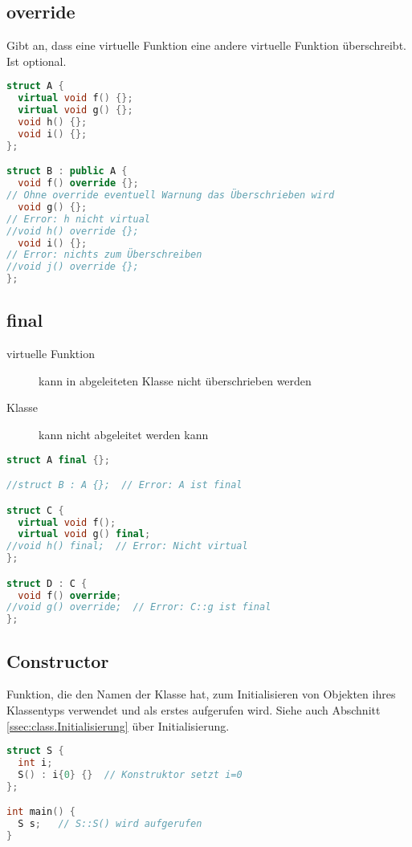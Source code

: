 \subsection{override}

Gibt an, dass eine virtuelle Funktion eine andere virtuelle Funktion
überschreibt. Ist optional.

\begin{lstlisting}[language=C++]
struct A {
  virtual void f() {};
  virtual void g() {};
  void h() {};
  void i() {};
};

struct B : public A {
  void f() override {};
// Ohne override eventuell Warnung das Überschrieben wird
  void g() {};
// Error: h nicht virtual
//void h() override {};
  void i() {};
// Error: nichts zum Überschreiben
//void j() override {};
};
\end{lstlisting}

\subsection{final}

\begin{description}
  \item[virtuelle Funktion] kann in abgeleiteten Klasse nicht überschrieben
  werden
  \item[Klasse] kann nicht abgeleitet werden kann
\end{description}

\begin{lstlisting}[language=C++]
struct A final {};

//struct B : A {};  // Error: A ist final

struct C {
  virtual void f();
  virtual void g() final;
//void h() final;  // Error: Nicht virtual
};

struct D : C {
  void f() override;
//void g() override;  // Error: C::g ist final
};
\end{lstlisting}

\subsection{Constructor}

Funktion, die den Namen der Klasse hat, zum Initialisieren von Objekten ihres
Klassentyps verwendet und als erstes aufgerufen wird.
Siehe auch Abschnitt \ref{ssec:class.Initialisierung} über Initialisierung.

\begin{lstlisting}[language=C++]
struct S {
  int i;
  S() : i{0} {}  // Konstruktor setzt i=0
};

int main() {
  S s;   // S::S() wird aufgerufen
}
\end{lstlisting}


